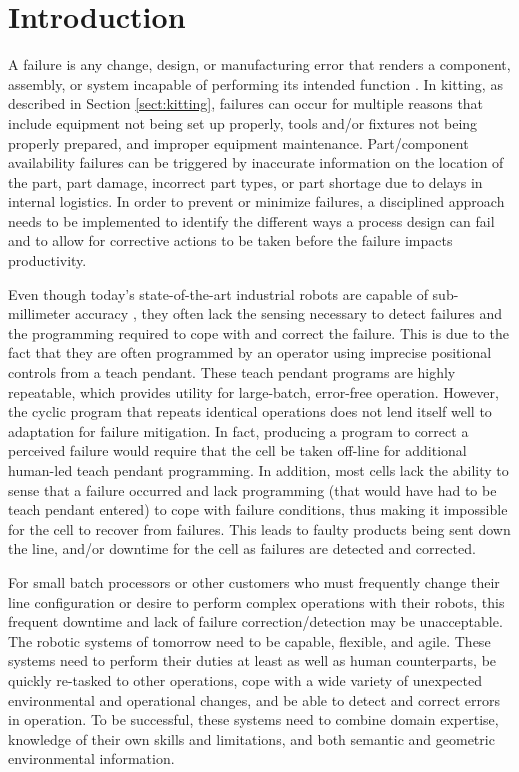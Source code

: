 \section{Introduction}
A failure is any change, design, or manufacturing error that renders a component, assembly, or system incapable of performing its intended function \cite{Collins93}. In kitting, as described in Section \ref{sect:kitting}, failures can occur for multiple reasons that include equipment not being set up properly, tools and/or fixtures not being properly prepared, and improper equipment maintenance. Part/component availability failures can be triggered by inaccurate information on the location of the part, part damage, incorrect part types, or part shortage due to delays in internal logistics. In order to prevent or minimize failures, a disciplined approach needs to be implemented to identify the different ways a process design can fail and to allow for corrective actions to be taken before the failure impacts productivity.

Even though today's state-of-the-art industrial robots are capable of sub-millimeter accuracy \cite{RobotAccuracy}, they often lack the sensing
necessary to detect failures and the programming required to cope with and correct the failure. This is due to the fact that they are often programmed
by an operator using imprecise positional controls from a teach pendant. These teach pendant programs are highly repeatable, which provides 
utility for large-batch, error-free operation. However, the cyclic program that repeats identical operations does not lend itself well to adaptation for 
failure mitigation. In fact, producing a program to correct a perceived failure would require that the cell be taken off-line
for additional human-led teach pendant programming. In addition, 
most cells lack the ability to sense that a failure occurred and  lack programming (that would have had to be teach pendant entered) to cope
with failure conditions, thus making it impossible for the cell to recover from failures.
This leads to faulty products being sent down the line, and/or downtime for the cell as failures are detected and corrected.

For small batch processors or other customers who must frequently change their line configuration or desire to perform complex operations
with their robots, this frequent downtime and lack of failure correction/detection may be unacceptable. The robotic systems of tomorrow need to be capable, flexible, and agile.  
These systems need to perform their duties at least  as well as human counterparts, be quickly re-tasked to other operations, cope with a wide 
variety of unexpected environmental and operational changes, and be able to detect and correct errors in operation. 
To be successful, these systems need to combine domain expertise, knowledge of their own skills and limitations, and both semantic and geometric 
environmental information.

